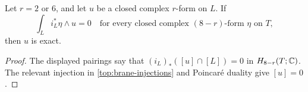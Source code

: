 \begin{corollary}\label{top:ambient-detection}
Let $r=2$ or $6$, and let $u$ be a closed complex $r$-form on $L$.
If
\[
 \int_L i_L^*\eta\wedge u=0
 \quad\text{for every closed complex $(8-r)$-form $\eta$ on $T$},
\]
then $u$ is exact.
\end{corollary}

\begin{proof}
The displayed pairings say that
$(i_L)_*([u]\cap[L])=0$ in $H_{8-r}(T;\mathbb C)$.
The relevant injection in \eqref{top:brane-injections}
and Poincar\'e duality give $[u]=0$.
\end{proof}
